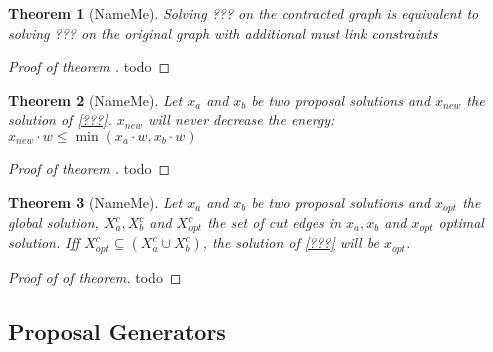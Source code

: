 \documentclass[10pt,twocolumn,letterpaper]{article}
\newtheorem{theorem}{Theorem}
\begin{document}
\begin{theorem}[NameMe]
Solving ??? on the contracted graph is 
equivalent to solving ??? on the 
original graph with additional 
must link constraints
\end{theorem}

\begin{proof}[Proof of theorem ]
todo
\end{proof}



\begin{theorem}[NameMe]
Let $x_{a}$ and $x_{b}$ be two proposal solutions and  $x_{new}$ the solution of \ref{???}.
$x_{new}$  will never decrease the energy:
$x_{new} \cdot w \leq  \min( x_{a}\cdot w,  x_{b}\cdot w) $ 
\end{theorem}

\begin{proof}[Proof of theorem ]
todo
\end{proof}



\begin{theorem}[NameMe]

Let $x_{a}$ and $x_{b}$ be two proposal solutions and  $x_{opt}$ the global solution,
$X_{a}^c, X_{b}^c$ and $ X_{opt}^c$ the set of cut edges in  $x_{a}, x_{b}$  and $ x_{opt}$
optimal solution.
Iff  $ X_{opt}^c \subseteq  (X_{a}^c \cup X_{b}^c)$,  the solution of \ref{???} will be $x_{opt}$.
\end{theorem}

\begin{proof}[Proof of of theorem]
todo
\end{proof}








\subsection{Proposal Generators}
\end{document}
